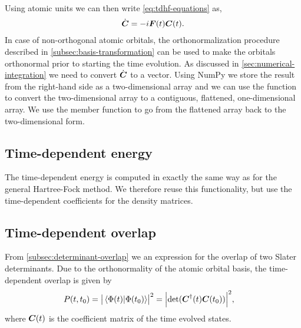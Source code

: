             Using atomic units we can then write \autoref{eq:tdhf-equations} as,
            \begin{align}
                \dot{\boldsymbol{C}} = -i\boldsymbol{F}(t)\boldsymbol{C}(t).
                \label{eq:tdhf-orthogonal}
            \end{align}
            In case of non-orthogonal atomic orbitals, the orthonormalization
            procedure described in \autoref{subsec:basis-transformation} can be
            used to make the orbitals orthonormal prior to starting the
            time evolution.
            As discussed in \autoref{sec:numerical-integration} we need to
            convert $\dot{\boldsymbol{C}}$ to a vector.
            Using NumPy we store the result from the right-hand side as a
            two-dimensional array and we can use the function  to
            convert the two-dimensional array to a contiguous, flattened,
            one-dimensional array.
            We use the member function  to go from the flattened
            array back to the two-dimensional form.

        \subsection{Time-dependent energy}
            The time-dependent energy is computed in exactly the same way as for
            the general Hartree-Fock method.
            We therefore reuse this functionality, but use the time-dependent
            coefficients for the density matrices.

        \subsection{Time-dependent overlap}
            From \autoref{subsec:determinant-overlap} we an expression for the
            overlap of two Slater determinants.
            Due to the orthonormality of the atomic orbital basis, the
            time-dependent overlap is given by
            \begin{align}
                P(t, t_0)
                =
                \abs{\braket*{\Phi(t)}{\Phi(t_0)}}^2
                &= \abs{\determinant(\vf{C}^{\dagger}(t)\vf{C}(t_0))}^{2},
            \end{align}
            where $\boldsymbol{C}(t)$ is the coefficient matrix of the time evolved states.


